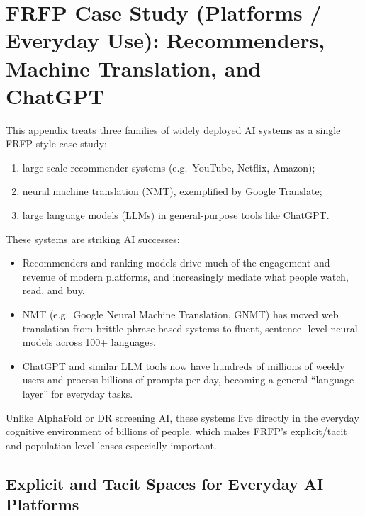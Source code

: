 
\section{FRFP Case Study (Platforms / Everyday Use):
Recommenders, Machine Translation, and ChatGPT}
\label{app:frfp-platforms}

This appendix treats three families of widely deployed AI systems as a single
FRFP-style case study:

\begin{enumerate}
\item large-scale recommender systems (e.g.\ YouTube, Netflix, Amazon);
\item neural machine translation (NMT), exemplified by Google Translate;
\item large language models (LLMs) in general-purpose tools like ChatGPT.
\end{enumerate}

These systems are striking AI successes:

\begin{itemize}
\item Recommenders and ranking models drive much of the engagement and
revenue of modern platforms, and increasingly mediate what people
watch, read, and buy.
\item NMT (e.g.\ Google Neural Machine Translation, GNMT) has moved web
translation from brittle phrase-based systems to fluent, sentence-
level neural models across 100+ languages.
\item ChatGPT and similar LLM tools now have hundreds of millions of weekly
users and process billions of prompts per day, becoming a general
“language layer” for everyday tasks.
\end{itemize}

Unlike AlphaFold or DR screening AI, these systems live directly in the
everyday cognitive environment of billions of people, which makes FRFP’s
explicit/tacit and population-level lenses especially important.

\subsection{Explicit and Tacit Spaces for Everyday AI Platforms}

